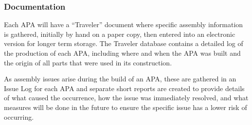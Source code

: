 \subsubsection{Documentation} 

Each APA will have a ``Traveler'' document where specific assembly information is gathered, initially by hand on a paper copy, then entered into an electronic version for longer term storage.  The Traveler database contains a detailed log of the production of each APA, including where and when the APA was built and the origin of all parts that were used in its construction. 

As assembly issues arise during the build of an APA, these are gathered in an Issue Log for each APA and separate short reports are created to provide details of what caused the occurrence, how the issue was immediately resolved, and what measures will be done in the future to ensure the specific issue has a lower risk of occurring.  %






